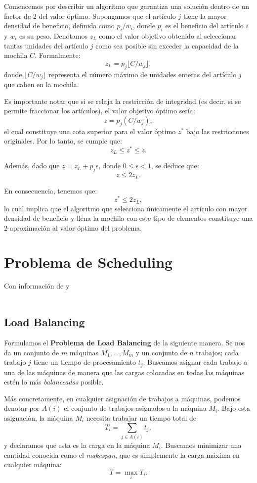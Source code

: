 \documentclass{report}
\begin{document}
Comencemos por describir un algoritmo que garantiza una solución dentro de un factor de 2 del valor óptimo. Supongamos que el artículo $ j $ tiene la mayor densidad de beneficio, definida como $ p_i / w_i $, donde $ p_i $ es el beneficio del artículo $ i $ y $ w_i $ es su peso. Denotamos $ z_L $ como el valor objetivo obtenido al seleccionar tantas unidades del artículo $ j $ como sea posible sin exceder la capacidad de la mochila $ C $. Formalmente:
\[
z_L = p_j \lfloor C / w_j \rfloor,
\]
donde $ \lfloor C / w_j \rfloor $ representa el número máximo de unidades enteras del artículo $ j $ que caben en la mochila.

Es importante notar que si se relaja la restricción de integridad (es decir, si se permite fraccionar los artículos), el valor objetivo óptimo sería:
\[
z = p_j (C / w_j),
\]
el cual constituye una cota superior para el valor óptimo $ z^* $ bajo las restricciones originales. Por lo tanto, se cumple que:
\[
z_L \leq z^* \leq z.
\]

Además, dado que $ z = z_L + p_j \epsilon $, donde $ 0 \leq \epsilon < 1 $, se deduce que:
\[
z \leq 2z_L.
\]

En consecuencia, tenemos que:
\[
z^* \leq 2z_L,
\]
lo cual implica que el algoritmo que selecciona únicamente el artículo con mayor densidad de beneficio y llena la mochila con este tipo de elementos constituye una $ 2 $-aproximación al valor óptimo del problema.


\chapter{Problema de Scheduling}
{Con información de \cite{Kleinberg2005} y \cite{Garey1979}\\\\}
	\section{Load Balancing}
	Formulamos el \textbf{Problema de Load Balancing} de la siguiente manera. Se nos da un conjunto de \( m \) máquinas \( M_1, \dots, M_m \) y un conjunto de \( n \) trabajos; cada trabajo \( j \) tiene un tiempo de procesamiento \( t_j \). Buscamos asignar cada trabajo a una de las máquinas de manera que las cargas colocadas en todas las máquinas estén lo más \textit{balanceadas} posible.
	
	Más concretamente, en cualquier asignación de trabajos a máquinas, podemos denotar por \( A(i) \) el conjunto de trabajos asignados a la máquina \( M_i \). Bajo esta asignación, la máquina \( M_i \) necesita trabajar un tiempo total de
	\[
	T_i = \sum_{j \in A(i)} t_j,
	\]
	y declaramos que esta es la carga en la máquina \( M_i \). Buscamos minimizar una cantidad conocida como el \textit{makespan}, que es simplemente la carga máxima en cualquier máquina:
	\[
	T = \max_i T_i.
	\]
	
\end{document}

